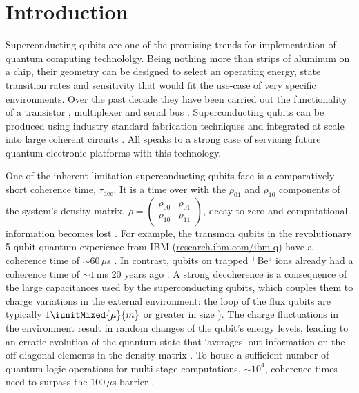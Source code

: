 
\section{Introduction}

\noindent Superconducting qubits are one of the promising trends for implementation of quantum
computing technololgy. Being  nothing more than strips  of aluminum on a  chip, their geometry
can be  designed to select  an operating energy, state  transition rates and  sensitivity that
would fit  the use-case of very  specific environments.  Over  the past decade they  have been
carried out  the functionality of a  transistor \cite{Astafiev2010}\cite{hoi2011}, multiplexer
\cite{honigl2018}  and serial  bus \cite{shen2005}.   Superconducting qubits  can be  produced
using industry  standard fabrication techniques  and integrated  at scale into  large coherent
circuits  \cite{johnson2010}.   All speaks  to  a  strong  case  of servicing  future  quantum
electronic platforms with this technology.

One of the inherent limitation superconducting  qubits face is a comparatively short coherence
time, $\tau_{\text{dec}}$.  It  is a time over  with the $\rho_{01}$ and $\rho_{10}$  components of the
system's                                    density                                    matrix,
$\rho    =    \ensuremath{\left(\begin{smallmatrix}    \rho_{00}    &    \rho_{01}    \\    \rho_{10}    &
      \rho_{11} \end{smallmatrix}\right)} $, decay to  zero and computational information becomes
lost \cite{phaseExp}.  For  example, the transmon qubits in the  revolutionary 5-qubit quantum
experience from IBM  (\href{http://www.research.ibm.com/ibm-q}{research.ibm.com/ibm-q}) have a
coherence  time   of  $  \sim  60\,\mu   $s  \cite{linke2017}.  In  contrast,   qubits  on  trapped
$  ^{+}  $Be$  ^{9}  $  ions  already  had  a  coherence  time  of  $\sim1\,  $ms  20  years  ago
\cite{monroe1995}.  A  strong decoherence is a  consequence of the large  capacitances used by
the  superconducting  qubits,  which  couples  them  to  charge  variations  in  the  external
environment: the  loop of the  flux qubits are typically  $ 1\iunitMixed{\mu}{m}$ or  greater in
size  \cite{Astafiev2010}\cite{hoi2011}\cite{johnson2010}).  The  charge fluctuations  in  the
environment result  in random  changes of  the qubit's  energy levels,  leading to  an erratic
evolution of the quantum state that `averages' out information on the off-diagonal elements in
the  density  matrix \cite{devoret2008}.   To  house  a  sufficient  number of  quantum  logic
operations for  multi-stage computations,  $ \sim  10^4 $,  coherence times  need to  surpass the
$ 100\,\mu$s barrier \cite{orlando1999}.
 
